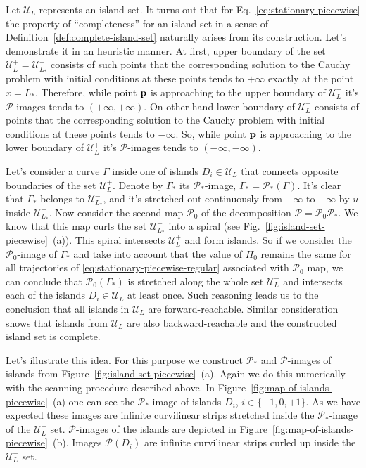 Let $\mathscr{U}_L$ represents an island set.
It turns out that for Eq.~\eqref{eq:stationary-piecewise} the property of ``completeness''  for an island set in a sense of Definition~\ref{def:complete-island-set} naturally arises from its construction.
Let's demonstrate it in an heuristic manner.
At first, upper boundary of the set $\mathscr{U}_L^+ = \mathscr{U}_{L_*}^+$ consists of such points that the corresponding solution to the Cauchy problem with initial conditions at these points tends to $+\infty$ exactly at the point $x = L_*$.
Therefore, while point $\vb{p}$ is approaching to the upper boundary of $\mathscr{U}_L^+$ it's $\mathcal{P}$-images tends to $(+\infty, +\infty)$.
On other hand lower boundary of $\mathscr{U}_L^+$ consists of points that the corresponding solution to the Cauchy problem with initial conditions at these points tends to $-\infty$.
So, while point $\vb{p}$ is approaching to the lower boundary of $\mathscr{U}_L^+$ it's $\mathcal{P}$-images tends to $(-\infty, -\infty)$.

Let's consider a curve $\Gamma$ inside one of islands $D_i \in \mathscr{U}_L$ that connects opposite boundaries of the set $\mathscr{U}_L^+$.
Denote by $\Gamma_*$ its $\mathcal{P}_*$-image, $\Gamma_* = \mathcal{P}_*(\Gamma)$.
It's clear that $\Gamma_*$ belongs to $\mathscr{U}_{L_*}^-$, and it's stretched out continuously from $-\infty$ to $+\infty$ by $u$ inside $\mathscr{U}_{L_*}^-$.
Now consider the second map $\mathcal{P}_0$ of the decomposition $\mathcal{P} = \mathcal{P}_0 \mathcal{P}_*$.
We know that this map curls the set $\mathscr{U}_{L_*}^-$ into a spiral (see Fig.~\ref{fig:island-set-piecewise}~(a)).
This spiral intersects $\mathscr{U}_L^+$ and form islands.
So if we consider the $\mathcal{P}_0$-image of $\Gamma_*$ and take into account that the value of $H_0$ remains the same for all trajectories of \eqref{eq:stationary-piecewise-regular} associated with $\mathcal{P}_0$ map, we can conclude that $\mathcal{P}_0(\Gamma_*)$ is stretched along the whole set $\mathscr{U}_L^-$ and intersects each of the islands $D_i \in \mathscr{U}_L$ at least once.
Such reasoning leads us to the conclusion that all islands in $\mathscr{U}_L$ are forward-reachable.
Similar consideration shows that islands from $\mathscr{U}_L$ are also backward-reachable and the constructed island set is complete.

Let's illustrate this idea.
For this purpose we construct $\mathcal{P}_*$ and $\mathcal{P}$-images of islands from Figure~\ref{fig:island-set-piecewise}~(a).
Again we do this numerically with the scanning procedure described above.
In Figure~\ref{fig:map-of-islands-piecewise}~(a) one can see the $\mathcal{P}_*$-image of islands $D_i$, $i \in \{ -1, 0, +1\}$.
As we have expected these images are infinite curvilinear strips stretched inside the $\mathcal{P}_*$-image of the $\mathscr{U}_L^+$ set.
$\mathcal{P}$-images of the islands are depicted in Figure~\ref{fig:map-of-islands-piecewise}~(b).
Images $\mathcal{P}(D_i)$ are infinite curvilinear strips curled up inside the $\mathscr{U}_L^-$ set.

